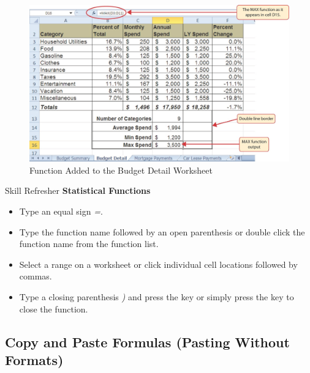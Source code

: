 \begin{figure}[H]
	\centering
	\includegraphics[width=\maxwidth{.95\linewidth}]{gfx/ch02_fig25}
	\caption{ Function Added to the Budget Detail Worksheet}
	\label{02:fig25}
\end{figure}

\begin{center}
	\begin{sklbox}{Skill Refresher}
		\textbf{Statistical Functions}
		\\
		\begin{itemize}
			\setlength{\itemsep}{0pt}
			\setlength{\parskip}{0pt}
			\setlength{\parsep}{0pt}

			\item Type an equal sign \textit{=}.
			\item Type the function name followed by an open parenthesis \fmtTyping{(} or double click the function name from the function list.
			\item Select a range on a worksheet or click individual cell locations followed by commas.
			\item Type a closing parenthesis \textit{)} and press the  key or simply press the  key to close the function.
			
		\end{itemize}
	\end{sklbox}
\end{center}

\subsection{Copy and Paste Formulas (Pasting Without Formats)}

